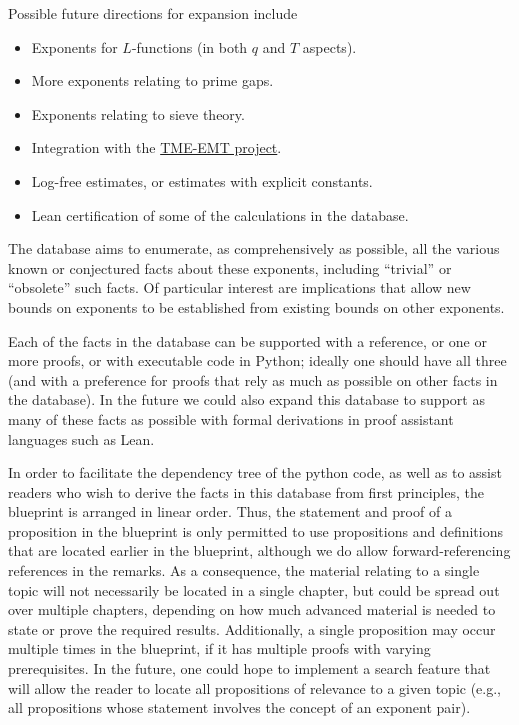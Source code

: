 Possible future directions for expansion include
\begin{itemize}
    \item Exponents for $L$-functions (in both $q$ and $T$ aspects).
    \item More exponents relating to prime gaps.
    \item Exponents relating to sieve theory.
    \item Integration with the \href{https://tmeemt.github.io/Chest/}{TME-EMT project}.
    \item Log-free estimates, or estimates with explicit constants.
    \item Lean certification of some of the calculations in the database.
\end{itemize}

The database aims to enumerate, as comprehensively as possible, all the various known or conjectured facts about these exponents, including ``trivial'' or ``obsolete'' such facts.  Of particular interest are implications that allow new bounds on exponents to be established from existing bounds on other exponents.

Each of the facts in the database can be supported with a reference, or one or more proofs, or with executable code in Python; ideally one should have all three (and with a preference for proofs that rely as much as possible on other facts in the database).  In the future we could also expand this database to support as many of these facts as possible with formal derivations in proof assistant languages such as Lean.

In order to facilitate the dependency tree of the python code, as well as to assist readers who wish to derive the facts in this database from first principles, the blueprint is arranged in linear order.  Thus, the statement and proof of a proposition in the blueprint is only permitted to use propositions and definitions that are located earlier in the blueprint, although we do allow forward-referencing references in the remarks.  As a consequence, the material relating to a single topic will not necessarily be located in a single chapter, but could be spread out over multiple chapters, depending on how much advanced material is needed to state or prove the required results.  Additionally, a single proposition may occur multiple times in the blueprint, if it has multiple proofs with varying prerequisites.  In the future, one could hope to implement a search feature that will allow the reader to locate all propositions of relevance to a given topic (e.g., all propositions whose statement involves the concept of an exponent pair).

